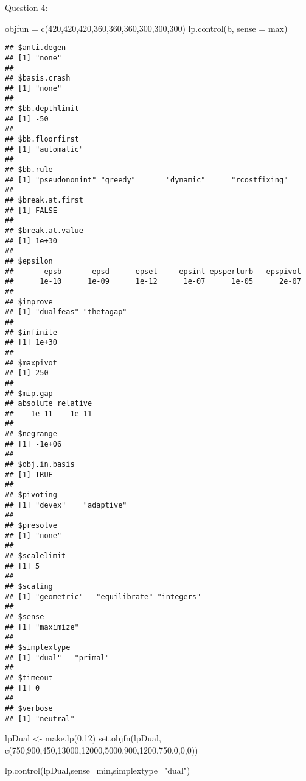 \documentclass[
]{article}
\newenvironment{Shaded}{\begin{snugshade}}{\end{snugshade}}
\newcommand{\AttributeTok}[1]{\textcolor[rgb]{0.77,0.63,0.00}{#1}}
\newcommand{\DecValTok}[1]{\textcolor[rgb]{0.00,0.00,0.81}{#1}}
\newcommand{\FunctionTok}[1]{\textcolor[rgb]{0.00,0.00,0.00}{#1}}
\newcommand{\NormalTok}[1]{#1}
\newcommand{\OtherTok}[1]{\textcolor[rgb]{0.56,0.35,0.01}{#1}}
\newcommand{\StringTok}[1]{\textcolor[rgb]{0.31,0.60,0.02}{#1}}
\begin{document}
Question 4:

\begin{Shaded}
\begin{Highlighting}[]
\NormalTok{objfun }\OtherTok{=} \FunctionTok{c}\NormalTok{(}\DecValTok{420}\NormalTok{,}\DecValTok{420}\NormalTok{,}\DecValTok{420}\NormalTok{,}\DecValTok{360}\NormalTok{,}\DecValTok{360}\NormalTok{,}\DecValTok{360}\NormalTok{,}\DecValTok{300}\NormalTok{,}\DecValTok{300}\NormalTok{,}\DecValTok{300}\NormalTok{)}
\FunctionTok{lp.control}\NormalTok{(b, }\AttributeTok{sense =} \StringTok{\textquotesingle{}max\textquotesingle{}}\NormalTok{)}
\end{Highlighting}
\end{Shaded}

\begin{verbatim}
## $anti.degen
## [1] "none"
## 
## $basis.crash
## [1] "none"
## 
## $bb.depthlimit
## [1] -50
## 
## $bb.floorfirst
## [1] "automatic"
## 
## $bb.rule
## [1] "pseudononint" "greedy"       "dynamic"      "rcostfixing" 
## 
## $break.at.first
## [1] FALSE
## 
## $break.at.value
## [1] 1e+30
## 
## $epsilon
##       epsb       epsd      epsel     epsint epsperturb   epspivot 
##      1e-10      1e-09      1e-12      1e-07      1e-05      2e-07 
## 
## $improve
## [1] "dualfeas" "thetagap"
## 
## $infinite
## [1] 1e+30
## 
## $maxpivot
## [1] 250
## 
## $mip.gap
## absolute relative 
##    1e-11    1e-11 
## 
## $negrange
## [1] -1e+06
## 
## $obj.in.basis
## [1] TRUE
## 
## $pivoting
## [1] "devex"    "adaptive"
## 
## $presolve
## [1] "none"
## 
## $scalelimit
## [1] 5
## 
## $scaling
## [1] "geometric"   "equilibrate" "integers"   
## 
## $sense
## [1] "maximize"
## 
## $simplextype
## [1] "dual"   "primal"
## 
## $timeout
## [1] 0
## 
## $verbose
## [1] "neutral"
\end{verbatim}

\begin{Shaded}
\begin{Highlighting}[]
\NormalTok{lpDual }\OtherTok{\textless{}{-}} \FunctionTok{make.lp}\NormalTok{(}\DecValTok{0}\NormalTok{,}\DecValTok{12}\NormalTok{)}
\FunctionTok{set.objfn}\NormalTok{(lpDual, }\FunctionTok{c}\NormalTok{(}\DecValTok{750}\NormalTok{,}\DecValTok{900}\NormalTok{,}\DecValTok{450}\NormalTok{,}\DecValTok{13000}\NormalTok{,}\DecValTok{12000}\NormalTok{,}\DecValTok{5000}\NormalTok{,}\DecValTok{900}\NormalTok{,}\DecValTok{1200}\NormalTok{,}\DecValTok{750}\NormalTok{,}\DecValTok{0}\NormalTok{,}\DecValTok{0}\NormalTok{,}\DecValTok{0}\NormalTok{))}

\FunctionTok{lp.control}\NormalTok{(lpDual,}\AttributeTok{sense=}\StringTok{\textquotesingle{}min\textquotesingle{}}\NormalTok{,}\AttributeTok{simplextype=}\StringTok{"dual"}\NormalTok{)}
\end{Highlighting}
\end{Shaded}
\end{document}

